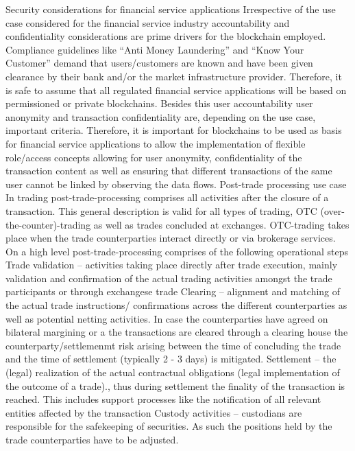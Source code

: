 Security considerations for financial service applications
Irrespective of the use case considered for the financial service industry accountability and confidentiality considerations are prime drivers for the blockchain employed. Compliance guidelines like “Anti Money Laundering” and “Know Your Customer” demand that users/customers are known and have been given clearance by their bank and/or the market infrastructure provider. Therefore, it is safe to assume that all regulated financial service applications will be based on permissioned or private blockchains. Besides this user accountability user anonymity and transaction confidentiality are, depending on the use case, important criteria. Therefore, it is important for blockchains to be used as basis for financial service applications to allow the implementation of flexible role/access concepts allowing for user anonymity, confidentiality of the transaction content as well as ensuring that different transactions of the same user cannot be linked by observing the data flows. 
Post-trade processing use case
In trading post-trade-processing comprises all activities after the closure of a transaction. This general description is valid for all types of trading, OTC (over-the-counter)-trading as well as trades concluded at exchanges. OTC-trading takes place when the trade counterparties interact directly or via brokerage services.
On a high level post-trade-processing comprises of the following operational steps 
Trade validation – activities taking place directly after trade execution, mainly validation and confirmation of the actual trading activities amongst the trade participants or through exchangese trade 
Clearing – alignment and  matching of the actual trade instructions/ confirmations across the different counterparties as well as potential netting activities. In case the counterparties have agreed on bilateral margining or a the transactions are cleared through a clearing house the counterparty/settlemenmt risk arising between the time of concluding the trade  and the time of settlement (typically 2 - 3 days) is mitigated. 
Settlement – the (legal) realization of the actual contractual obligations (legal implementation of the outcome of a trade)., thus during settlement the finality of the transaction is reached. This includes support processes like the notification of all relevant entities affected by the transaction
Custody activities – custodians are responsible for the safekeeping of securities. As such the positions held by the trade counterparties have to be adjusted. 

